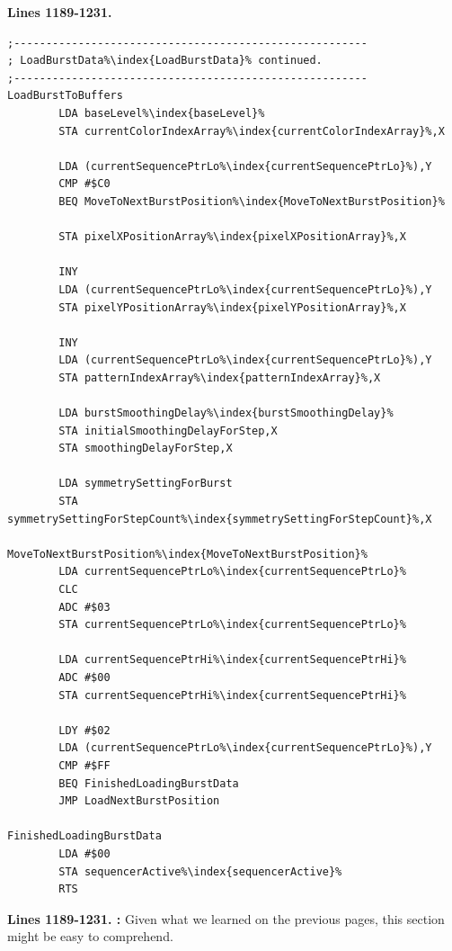 \clearpage
\textbf{Lines 1189-1231. }
\begin{lstlisting}[escapechar=\%]
;-------------------------------------------------------
; LoadBurstData%\index{LoadBurstData}% continued.
;-------------------------------------------------------
LoadBurstToBuffers
        LDA baseLevel%\index{baseLevel}%
        STA currentColorIndexArray%\index{currentColorIndexArray}%,X

        LDA (currentSequencePtrLo%\index{currentSequencePtrLo}%),Y
        CMP #$C0
        BEQ MoveToNextBurstPosition%\index{MoveToNextBurstPosition}%

        STA pixelXPositionArray%\index{pixelXPositionArray}%,X

        INY 
        LDA (currentSequencePtrLo%\index{currentSequencePtrLo}%),Y
        STA pixelYPositionArray%\index{pixelYPositionArray}%,X

        INY 
        LDA (currentSequencePtrLo%\index{currentSequencePtrLo}%),Y
        STA patternIndexArray%\index{patternIndexArray}%,X

        LDA burstSmoothingDelay%\index{burstSmoothingDelay}%
        STA initialSmoothingDelayForStep,X
        STA smoothingDelayForStep,X

        LDA symmetrySettingForBurst
        STA symmetrySettingForStepCount%\index{symmetrySettingForStepCount}%,X

MoveToNextBurstPosition%\index{MoveToNextBurstPosition}%
        LDA currentSequencePtrLo%\index{currentSequencePtrLo}%
        CLC 
        ADC #$03
        STA currentSequencePtrLo%\index{currentSequencePtrLo}%

        LDA currentSequencePtrHi%\index{currentSequencePtrHi}%
        ADC #$00
        STA currentSequencePtrHi%\index{currentSequencePtrHi}%

        LDY #$02
        LDA (currentSequencePtrLo%\index{currentSequencePtrLo}%),Y
        CMP #$FF
        BEQ FinishedLoadingBurstData
        JMP LoadNextBurstPosition

FinishedLoadingBurstData
        LDA #$00
        STA sequencerActive%\index{sequencerActive}%
        RTS 
\end{lstlisting}
\clearpage

\textbf{Lines 1189-1231. :}  Given what we learned on the previous pages, this section might be easy to comprehend.

